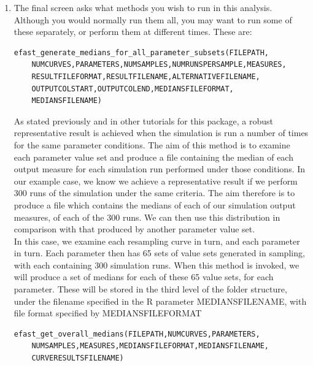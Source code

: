 \documentclass[a4paper,11pt]{article}
\begin{document}
\begin{enumerate}
\item The final screen asks what methods you wish to run in this analysis. Although you would normally run them all, you may want to run some of these separately, or perform them at different times. These are:

\begin{verbatim}
efast_generate_medians_for_all_parameter_subsets(FILEPATH,
	NUMCURVES,PARAMETERS,NUMSAMPLES,NUMRUNSPERSAMPLE,MEASURES,
	RESULTFILEFORMAT,RESULTFILENAME,ALTERNATIVEFILENAME,
	OUTPUTCOLSTART,OUTPUTCOLEND,MEDIANSFILEFORMAT,
	MEDIANSFILENAME)
\end{verbatim}

As stated previously and in other tutorials for this package, a robust representative result is achieved when the simulation is run a number of times for the same parameter conditions. The aim of this method is to examine each parameter value set and produce a file containing the median of each output measure for each simulation run performed under those conditions. In our example case, we know we achieve a representative result if we perform 300 runs of the simulation under the same criteria. The aim therefore is to produce a file which contains the medians of each of our simulation output measures, of each of the 300 runs. We can then use this distribution in comparison with that produced by another parameter value set.
\\
In this case, we examine each resampling curve in turn, and each parameter in turn. Each parameter then has 65 sets of value sets generated in sampling, with each containing 300 simulation runs. When this method is invoked, we will produce a set of medians for each of these 65 value sets, for each parameter. These will be stored in the third level of the folder structure, under the filename specified in the R parameter MEDIANSFILENAME, with file format specified by MEDIANSFILEFORMAT\\

\begin{verbatim}
efast_get_overall_medians(FILEPATH,NUMCURVES,PARAMETERS,
	NUMSAMPLES,MEASURES,MEDIANSFILEFORMAT,MEDIANSFILENAME,
	CURVERESULTSFILENAME)
\end{verbatim}


\end{enumerate}
\end{document}
